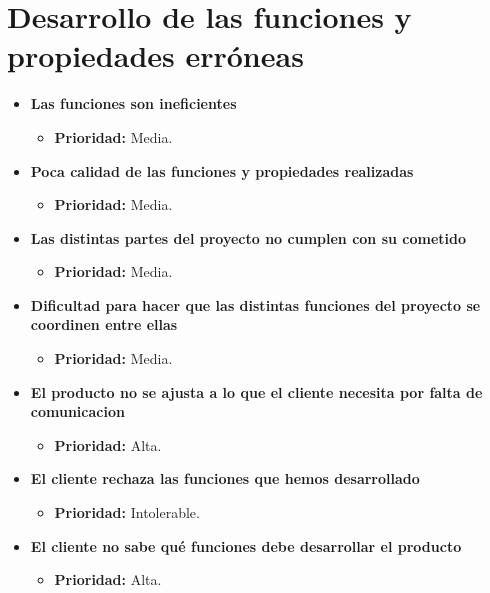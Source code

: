 \documentclass[spanish,a4paper,12pt]{report}	%
\begin{document}
\section{Desarrollo de las funciones y propiedades erróneas}
	\begin{itemize}
		\item \textbf{Las funciones son ineficientes}
			\begin{itemize}
				\item \textbf{Prioridad: }Media.
			\end{itemize}
		
		\item \textbf{Poca calidad de las funciones y propiedades realizadas}
			\begin{itemize}
				\item \textbf{Prioridad: }Media.
			\end{itemize}
		
		\item \textbf{Las distintas partes del proyecto no cumplen con su cometido}
			\begin{itemize}
				\item \textbf{Prioridad: }Media.
			\end{itemize}
		
		\item \textbf{Dificultad para hacer que las distintas funciones del proyecto se coordinen entre ellas}
			\begin{itemize}
				\item \textbf{Prioridad: }Media.
			\end{itemize}
		
		\item \textbf{El producto no se ajusta a lo que el cliente necesita por falta de comunicacion}%
			\begin{itemize}
				\item \textbf{Prioridad: }Alta.
			\end{itemize}
		
		\item \textbf{El cliente rechaza las funciones que hemos desarrollado}
			\begin{itemize}
				\item \textbf{Prioridad: }Intolerable.
			\end{itemize}
		
		\item \textbf{El cliente no sabe qué funciones debe desarrollar el producto}%
			\begin{itemize}
				\item \textbf{Prioridad: }Alta.
			\end{itemize}
		

\end{itemize}
\end{document}
